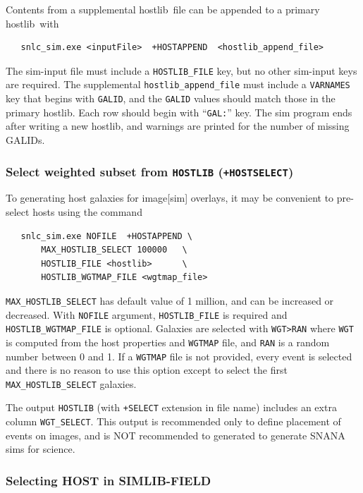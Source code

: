 \documentclass[12pt]{article}
\newcommand{\hostlib}{{\sc hostlib}}
\begin{document}
{Contents from a supplemental \hostlib\ file can be appended to a
primary \hostlib\ with
\begin{verbatim}
   snlc_sim.exe <inputFile>  +HOSTAPPEND  <hostlib_append_file>
\end{verbatim} 
The sim-input file must include a {\tt HOSTLIB\_FILE} key,
but no other sim-input keys are required.
The supplemental {\tt hostlib\_append\_file} must include a
{\tt VARNAMES} key that begins with {\tt GALID}, and the
{\tt GALID} values should match those in the primary \hostlib.
Each row should begin with ``{\tt GAL:}'' key. 
The sim program ends after writing a new \hostlib,
and warnings are printed for the number of missing GALIDs.

\subsubsection{Select weighted subset from {\tt HOSTLIB} ({\tt +HOSTSELECT}) }
\label{sss:hostlib_select}

To generating host galaxies for image[sim] overlays, it may be convenient to pre-select
hosts using the command
%
\begin{verbatim}                                   
   snlc_sim.exe NOFILE  +HOSTAPPEND \
       MAX_HOSTLIB_SELECT 100000   \
       HOSTLIB_FILE <hostlib>      \
       HOSTLIB_WGTMAP_FILE <wgtmap_file>
\end{verbatim} 
%
\verb|MAX_HOSTLIB_SELECT| has default value of 1 million, and can be increased or decreased.
With  \verb|NOFILE| argument, \verb|HOSTLIB_FILE| is required and
\verb|HOSTLIB_WGTMAP_FILE| is optional.  Galaxies are selected with \verb|WGT>RAN|
where \verb|WGT| is computed from the host properties and \verb|WGTMAP| file, and
\verb|RAN| is a random number between 0 and 1. If a \verb|WGTMAP| file is not
provided, every event is selected and there is no reason to use this option
except to select the first \verb|MAX_HOSTLIB_SELECT| galaxies.

The output \verb|HOSTLIB| (with \verb|+SELECT| extension in file name) includes
an extra column \verb|WGT_SELECT|. This output is recommended only to define placement
of events on images, and is NOT recommended to generated to generate SNANA sims for science.



\clearpage
\subsubsection{Selecting HOST in SIMLIB-FIELD }
\label{sss:hostlib_field}

}
\end{document}
